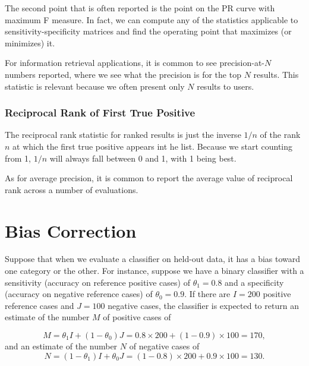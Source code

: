 The second point that is often reported is the point on the PR curve
with maximum F measure.  In fact, we can compute any of the statistics
applicable to sensitivity-specificity matrices and find the operating
point that maximizes (or minimizes) it.

For information retrieval applications, it is common to see
precision-at-$N$ numbers reported, where we see what the precision is
for the top $N$ results.  This statistic is relevant because we often
present only $N$ results to users.


\subsubsection{Reciprocal Rank of First True Positive}

The reciprocal rank statistic for ranked results is just the inverse
$1/n$ of the rank $n$ at which the first true positive appears int he
list.  Because we start counting from 1, $1/n$ will always fall
between 0 and 1, with 1 being best.  

As for average precision, it is common to report the average
value of reciprocal rank across a number of evaluations.  




\section{Bias Correction}

Suppose that when we evaluate a classifier on held-out data, it has a
bias toward one category or the other.  For instance, suppose we have
a binary classifier with a sensitivity (accuracy on reference positive
cases) of $\theta_1 = 0.8$ and a specificity (accuracy on negative
reference cases) of $\theta_0 = 0.9$.  If there are $I = 200$ positive
reference cases and $J = 100$ negative cases, the classifier is
expected to return an estimate of the number $M$ of positive cases
of 

\begin{equation}
M = \theta_1 I + (1-\theta_0) J = 0.8 \times 200 + (1 - 0.9) \times 100 = 170,
\end{equation}
%
and an estimate of the number $N$ of negative cases of
%
\begin{equation}
N = (1-\theta_1) I + \theta_0 J = (1-0.8) \times 200 +  0.9 \times 100 = 130.
\end{equation}


